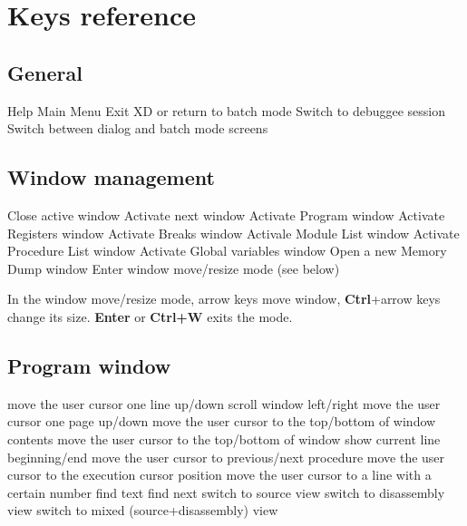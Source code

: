 \chapter{Keys reference}

\section{General}

\KeyListBegin{8 cm}
 {Help}
 {Main Menu}
 {Exit XD or return to batch mode}
\KeyDef{/} {Switch to debuggee session}
\KeyDef{\bs{}} {Switch between dialog and batch mode screens}
\KeyListEnd{}

\section{Window management}

\KeyListBegin{8 cm}
 {Close active window}
 {Activate next window}
 {Activate Program window}
 {Activate Registers window}
 {Activate Breaks window}
 {Activale Module List window}
 {Activate Procedure List window}
 {Activate Global variables window}
 {Open a new Memory Dump window}
 {Enter window move/resize mode (see below)}
\KeyListEnd{}

In the window move/resize mode, arrow keys move window,
{\bf Ctrl}+arrow keys change its size. {\bf Enter} or
{\bf Ctrl+W} exits the mode.

\section{Program window}

\KeyListBegin{8 cm}
 {move the user cursor one line up/down}
 {scroll window left/right}
 {move the user cursor one page up/down}
 {move the user cursor to the top/bottom of window contents}
 {move the user cursor to the top/bottom of window}
 {show current line beginning/end}
 {move the user cursor to previous/next procedure}
 {move the user cursor to the execution cursor position}
 {move the user cursor to a line with a certain number}
 {find text}
 {find next}
 {switch to source view}
 {switch to disassembly view}
 {switch to mixed (source+disassembly) view}
\KeyListEnd{}

